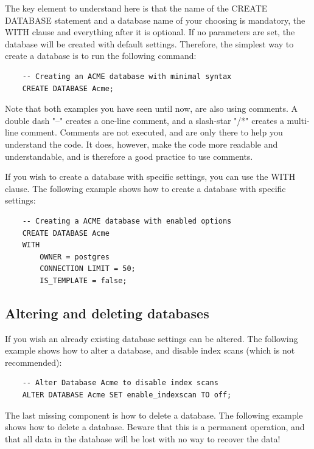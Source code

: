 The key element to understand here is that the name of the CREATE DATABASE statement and a database name of your choosing is mandatory, the WITH clause and everything after it is optional. If no parameters are set, the database will be created with default settings. Therefore, the simplest way to create a database is to run the following command:

\begin{verbatim}
    -- Creating an ACME database with minimal syntax
    CREATE DATABASE Acme;
\end{verbatim}

Note that both examples you have seen until now, are also using comments. A double dash "--" creates a one-line comment, and a slash-star "/*" creates a multi-line comment. Comments are not executed, and are only there to help you understand the code. It does, however, make the code more readable and understandable, and is therefore a good practice to use comments.

If you wish to create a database with specific settings, you can use the WITH clause. The following example shows how to create a database with specific settings:

\begin{verbatim}
    -- Creating a ACME database with enabled options
    CREATE DATABASE Acme 
    WITH
        OWNER = postgres
        CONNECTION LIMIT = 50;
        IS_TEMPLATE = false;
\end{verbatim}

\subsection{Altering and deleting databases}
If you wish an already existing database settings can be altered. The following example shows how to alter a database, and disable index scans (which is not recommended):

\begin{verbatim}
    -- Alter Database Acme to disable index scans
    ALTER DATABASE Acme SET enable_indexscan TO off;
\end{verbatim}

The last missing component is how to delete a database. The following example shows how to delete a database. Beware that this is a permanent operation, and that all data in the database will be lost with no way to recover the data!

